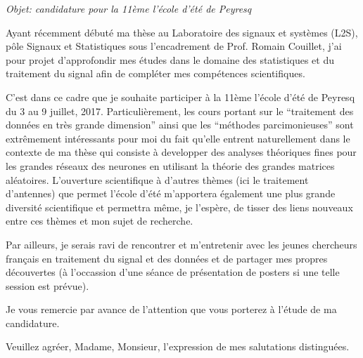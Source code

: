 \documentclass[10pt,stdletter,dateno,sigleft]{newlfm} %
\begin{document}
\begin{newlfm}


\textit{Objet: candidature pour la 11ème l'école d'été de Peyresq}

Ayant récemment débuté ma thèse au Laboratoire des signaux et systèmes (L2S), pôle Signaux et Statistiques sous l'encadrement de Prof. Romain Couillet, j'ai pour projet d'approfondir mes études dans le domaine des statistiques et du traitement du signal afin de compléter mes compétences  scientifiques.

C'est dans ce cadre que je souhaite participer à la 11ème l'école d'été de Peyresq du 3 au 9 juillet, 2017. Particulièrement, les cours portant sur le ``traitement des données en très grande dimension'' ainsi que les ``méthodes
parcimonieuses'' sont extrêmement intéressants pour moi du fait qu'elle entrent naturellement dans le contexte de ma thèse qui consiste à developper des analyses théoriques fines pour les grandes réseaux des neurones en utilisant la théorie des grandes matrices aléatoires. L'ouverture scientifique à d'autres thèmes (ici le traitement d'antennes) que permet l'école d'été
m'apportera également une plus grande diversité scientifique et permettra même, je l'espère, de tisser des liens nouveaux entre ces thèmes et mon sujet de recherche.

Par ailleurs, je serais ravi de rencontrer et m'entretenir avec les jeunes chercheurs français en traitement du signal et des données
et de partager mes propres découvertes (à l'occassion d'une séance de présentation de posters si une telle session est prévue).

Je vous remercie par avance de l'attention que vous porterez à l'étude de ma candidature.

Veuillez agréer, Madame, Monsieur, l'expression de mes salutations distinguées.


\end{newlfm}
\end{document}

